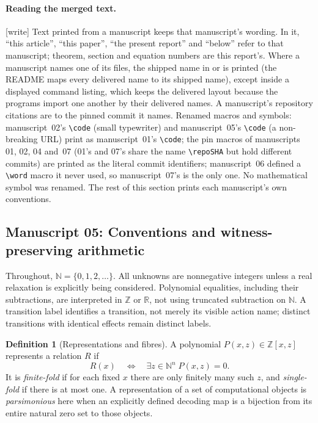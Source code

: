 \documentclass[11pt,a4paper]{article}
\theoremstyle{definition}
\newtheorem{definition}[definition]{Definition}
\theoremstyle{remark}
\newcommand{\N}{\mathbb N}
\newcommand{\Z}{\mathbb Z}
\newcommand{\R}{\mathbb R}
\newcommand{\code}[1]{\texttt{\detokenize{#1}}}
\newcommand{\word}[1]{\mathtt{#1}}
\newcommand{\wtag}{\textup{[write]}}%
\begin{document}
\paragraph{Reading the merged text.}
\wtag{} Text printed from a manuscript keeps that manuscript's wording. In it, ``this article'', ``this paper'', ``the present report'' and ``below'' refer to that manuscript; theorem, section and equation numbers are this report's. Where a manuscript names one of its files, the shipped name in  or  is printed (the README maps every delivered name to its shipped name), except inside a displayed command listing, which keeps the delivered layout because the programs import one another by their delivered names. A manuscript's repository citations are to the pinned commit it names. Renamed macros and symbols: manuscript~02's \verb|\code| (small typewriter) and manuscript~05's \verb|\code| (a non-breaking URL) print as manuscript~01's \verb|\code|; the pin macros of manuscripts 01, 02, 04 and~07 (01's and 07's share the name \verb|\repoSHA| but hold different commits) are printed as the literal commit identifiers; manuscript~06 defined a \verb|\word| macro it never used, so manuscript~07's is the only one. No mathematical symbol was renamed. The rest of this section prints each manuscript's own conventions.

\subsection{Manuscript 05: Conventions and witness-preserving arithmetic}
\label{cdc:sec:conventions}
Throughout, $\N=\{0,1,2,\ldots\}$. All unknowns are nonnegative integers unless a real relaxation is explicitly being considered. Polynomial equalities, including their subtractions, are interpreted in $\Z$ or $\R$, not using truncated subtraction on $\N$. A transition label identifies a transition, not merely its visible action name; distinct transitions with identical effects remain distinct labels.

\begin{definition}[Representations and fibres]
A polynomial $P(x,z)\in\Z[x,z]$ represents a relation $R$ if
\[
R(x)\quad\Longleftrightarrow\quad\exists z\in\N^n\;P(x,z)=0.
\]
It is \emph{finite-fold} if for each fixed $x$ there are only finitely many such $z$, and \emph{single-fold} if there is at most one. A representation of a set of computational objects is \emph{parsimonious} here when an explicitly defined decoding map is a bijection from its entire natural zero set to those objects.
\end{definition}
\end{document}
